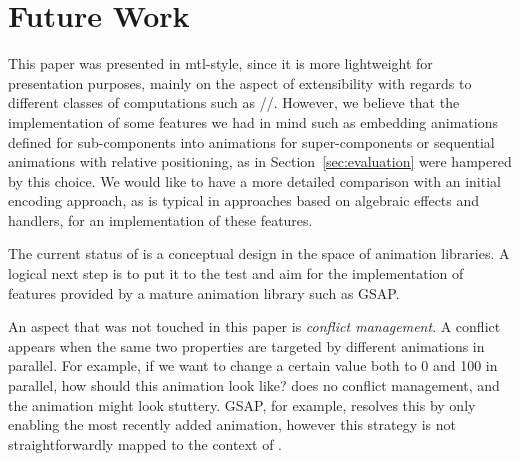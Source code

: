 \section{Future Work}
\label{sec:future}

This paper was presented in mtl-style, since it is more lightweight for presentation purposes, mainly on the aspect of extensibility with regards to different classes of computations such as //. However, we believe that the implementation of some features we had in mind such as embedding animations defined for sub-components into animations for super-components or sequential animations with relative positioning, as in Section~\ref{sec:evaluation} were hampered by this choice. We would like to have a more detailed comparison with an initial encoding approach, as is typical in approaches based on algebraic effects and handlers, for an implementation of these features.

The current status of \dsl{} is a conceptual design in the space of animation libraries. A logical next step is to put it to the test and aim for the implementation of features provided by a mature animation library such as GSAP.

An aspect that was not touched in this paper is \emph{conflict management}. A conflict appears when the same two properties are targeted by different animations in parallel. For example, if we want to change a certain value both to 0 and 100 in parallel, how should this animation look like? \dsl{} does no conflict management, and the animation might look stuttery. GSAP, for example, resolves this by only enabling the most recently added animation, however this strategy is not straightforwardly mapped to the context of \dsl{}.

